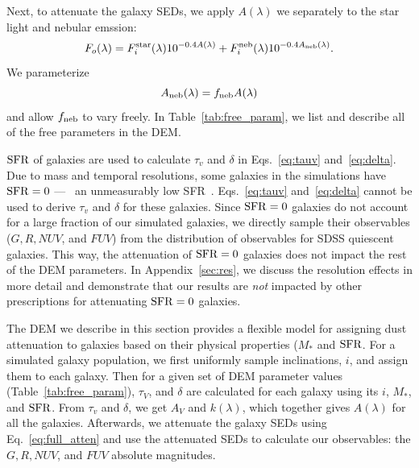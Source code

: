 Next, to attenuate the galaxy SEDs, we apply $A(\lambda)$ we separately to the
star light and nebular emssion: 
\begin{equation} \label{eq:full_atten}
    F_o (\lambda) = F^{\rm star}_i (\lambda) 10^{-0.4 A(\lambda)} + F^{\rm
    neb}_i (\lambda) 10^{-0.4 A_{\rm neb}(\lambda)}.
\end{equation}
We parameterize
\begin{equation}
    A_{\rm neb}(\lambda) = f_{\rm neb}  A(\lambda) 
\end{equation} 
and allow $f_{\rm neb}$ to vary freely. In Table~\ref{tab:free_param}, we list
and describe all of the free parameters in the DEM. 

${\rm SFR}$ of galaxies are used to calculate $\tau_v$ and $\delta$ in
Eqs.~\ref{eq:tauv} and~\ref{eq:delta}. Due to mass and temporal resolutions,
some galaxies in the simulations have ${\rm SFR}=0$ --- \ie~an unmeasurably low
SFR~\citep{hahn2019c}. Eqs.~\ref{eq:tauv} and~\ref{eq:delta} cannot be used to
derive $\tau_v$ and $\delta$ for these galaxies. Since ${\rm SFR}=0$ galaxies do
not account for a large fraction of our simulated galaxies, we directly sample 
their observables ($G, R, NUV$, and $FUV$) from the distribution of observables
for SDSS quiescent galaxies. This way, the attenuation of ${\rm SFR}=0$ galaxies 
does not impact the rest of the DEM parameters. In Appendix~\ref{sec:res}, we 
discuss the resolution effects in more detail and demonstrate that our results
are \emph{not} impacted by other prescriptions for attenuating ${\rm SFR}=0$ galaxies.

The DEM we describe in this section provides a flexible model for assigning
dust attenuation to galaxies based on their physical properties ($M_*$ and
${\rm SFR}$. For a simulated galaxy population, we first uniformly sample inclinations, 
$i$, and assign them to each galaxy. Then for a given set of DEM parameter values 
(Table~\ref{tab:free_param}), $\tau_V$, and $\delta$ are calculated for each 
galaxy using its $i$, $M_*$, and ${\rm SFR}$. From $\tau_v$ and $\delta$, we get 
$A_V$ and $k(\lambda)$, which together gives $A(\lambda)$ for all the galaxies.
Afterwards, we attenuate the galaxy SEDs using Eq.~\ref{eq:full_atten} and use 
the attenuated SEDs to calculate our observables: the $G, R, NUV$, and $FUV$
absolute magnitudes.  

